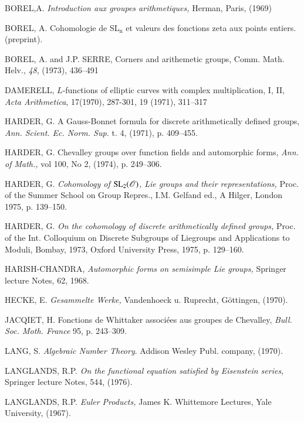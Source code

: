 \begin{thebibliography}{99}
 BOREL,\pageoriginale A. {\em Introduction aux groupes arithmetiques,} Herman, Paris, (1969)

 BOREL, A. Cohomologie de SL$_{\text{n}}$ et valeurs des fonctions zeta aux points entiers. (preprint).

 BOREL, A. and J.P. SERRE, Corners and arithemetic groups, Comm. Math. Helv., {\em 48}, (1973), 436--491

 DAMERELL, $L$-functions of elliptic curves with complex multiplication, I, II, {\em Acta Arithmetica}, 17(1970), 287-301, 19 (1971), 311--317

 HARDER, G. A Gauss-Bonnet formula for discrete arithmetically defined groups, {\em Ann. Scient. Ec. Norm. Sup.} t. 4, (1971), p. 409--455.

 HARDER, G. Chevalley groups over function fields and automorphic forms, {\em Ann. of Math.,} vol 100, No 2, (1974), p. 249--306.

 HARDER, G. {\em Cohomology of $\mathrm{SL}_{2}(\mathscr{O})$, Lie groups and their representations,} Proc. of the Summer School on Group Repres., I.M. Gelfand ed., A Hilger, London 1975, p. 139--150.

 HARDER, G. {\em On the cohomology of discrete arithmetically defined groups,} Proc. of the Int. Colloquium on Discrete Subgroups of Liegroups and Applications to Moduli, Bombay, 1973, Oxford University Press, 1975, p. 129--160.

 HARISH-CHANDRA, {\em Automorphic forms on semisimple Lie groups,} Springer lecture Notes, 62, 1968.

 HECKE, E. {\em Gesammelte Werke,} Vandenhoeck u. Ruprecht, G\"ottingen, (1970).

 JACQIET, H. Fonctions de Whittaker associ\'ees aus groupes de Chevalley, {\em Bull. Soc. Moth. France} 95, p. 243--309.

 LANG, S. {\em Algebraic Number Theory}. Addison Wesley Publ. company, (1970). 

 LANGLANDS, R.P. {\em On the functional equation satisfied by Eisenstein series,} Springer lecture Notes, 544, (1976).

 LANGLANDS, R.P. {\em Euler Products,} James K. Whittemore Lectures, Yale University, (1967).


\end{thebibliography}
